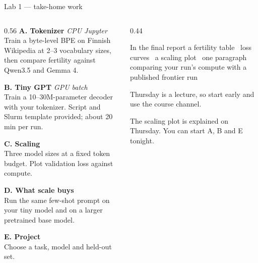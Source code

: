 \documentclass[aspectratio=169,10pt]{beamer}
\begin{document}
\begin{frame}[shrink=15]{Lab 1 --- take-home work}
  \begin{columns}[T]
    \begin{column}{0.56\textwidth}
      \textbf{A. Tokenizer} \hfill \textit{CPU Jupyter}\\
      Train a byte-level BPE on Finnish Wikipedia at 2--3 vocabulary sizes,
      then compare fertility against Qwen3.5 and Gemma 4.
      \vspace{0.25em}

      \textbf{B. Tiny GPT} \hfill \textit{GPU batch}\\
      Train a 10--30M-parameter decoder with your tokenizer. Script and
      Slurm template provided; about 20 min per run.
      \vspace{0.25em}

      \textbf{C. Scaling}\\
      Three model sizes at a fixed token budget. Plot validation loss
      against compute.
      \vspace{0.25em}

      \textbf{D. What scale buys}\\
      Run the same few-shot prompt on your tiny model and on a larger
      pretrained base model.
      \vspace{0.25em}

      \textbf{E. Project}\\
      Choose a task, model and held-out set.
    \end{column}
    \begin{column}{0.44\textwidth}
      \begin{block}{In the final report}
        \small
        a fertility table \textbullet\ loss curves \textbullet\ a scaling plot
        \textbullet\ one paragraph comparing your run's compute with a published
        frontier run
      \end{block}
      \begin{gotcha}
        Thursday is a lecture, so start early and use the course channel.
      \end{gotcha}
      \vspace{0.2em}
      \small
      The scaling plot is explained on Thursday. You can start A, B and E
      tonight.
    \end{column}
  \end{columns}
\end{frame}
\end{document}
